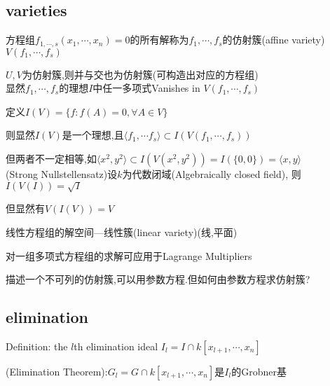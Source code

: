 \subsection{varieties}
方程组$ f_{1,\cdots,s}(x_1,\cdots,x_n)=0$的所有解称为$ f_1,\cdots,f_s$的仿射簇(affine variety)$ V(f_1,\cdots,f_s)$

$ U,V$为仿射簇,则并与交也为仿射簇(可构造出对应的方程组)
\\

显然$ f_1,\cdots,f_s$的理想$ I$中任一多项式Vanishes in $ V(f_1,\cdots,f_s)$

定义$ I(V)=\{f:f(A)=0 ,\forall A \in V\}$

则显然$ I(V)$是一个理想,且$  \langle f_1,\cdots f_s \rangle  \subset I(V(f_1,\cdots,f_s))$

但两者不一定相等,如$  \langle x^2,y^2 \rangle \subset I(V(x^2,y^2))=I(\{0,0\})= \langle x,y \rangle $
\\

(Strong Nullstellensatz)设$ k$为代数闭域(Algebraically closed field),
则$ I(V(I))=\sqrt{I}$

但显然有$ V(I(V))=V$

线性方程组的解空间---线性簇(linear variety)(线,平面)

对一组多项式方程组的求解可应用于Lagrange Multipliers

描述一个不可列的仿射簇,可以用参数方程.但如何由参数方程求仿射簇?


\subsection{elimination}
Definition: the $ l$th elimination ideal $ I_l=I\cap k[x_{l+1},\cdots,x_n]$

(Elimination Theorem):$ G_l=G\cap k[x_{l+1},\cdots,x_n]$是$ I_l$的Grobner基

